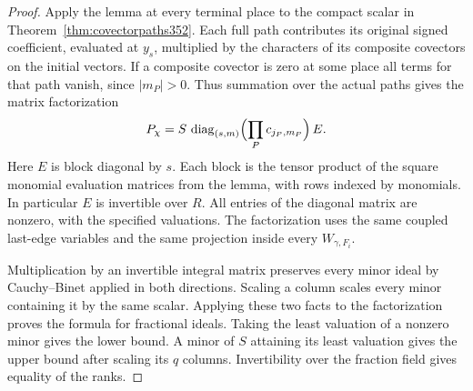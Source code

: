 \documentclass[a4paper,11pt]{article}
\theoremstyle{definition}
\theoremstyle{remark}
\numberwithin{equation}{section}
\begin{document}
\begin{proof}
Apply the lemma at every terminal place to the compact scalar in
Theorem~\ref{thm:covectorpaths352}. Each full path contributes
its original signed coefficient, evaluated at \(y_s\), multiplied
by the characters of its composite covectors on the initial
vectors. If a composite covector is zero at some place all
terms for that path vanish, since \(|m_P|>0\). Thus summation
over the actual paths gives the matrix factorization
\[
    P_\chi = S\,\operatorname{diag}_{(s,m)}
             \Bigl(\prod_P c_{j_P,m_P}\Bigr)\, E .
\]
Here \(E\) is block diagonal by \(s\). Each block is the tensor
product of the square monomial evaluation matrices from the
lemma, with rows indexed by monomials. In particular \(E\) is
invertible over \(R\). All entries of the diagonal matrix are
nonzero, with the specified valuations. The factorization uses
the same coupled last-edge variables and the same projection
inside every \(W_{\gamma,F_i}\).

Multiplication by an invertible integral matrix preserves every
minor ideal by Cauchy--Binet applied in both directions. Scaling
a column scales every minor containing it by the same scalar.
Applying these two facts to the factorization proves the formula
for fractional ideals. Taking the least valuation of a nonzero
minor gives the lower bound. A minor of \(S\) attaining its
least valuation gives the upper bound after scaling its \(q\)
columns. Invertibility over the fraction field gives equality
of the ranks.
\end{proof}
\end{document}
